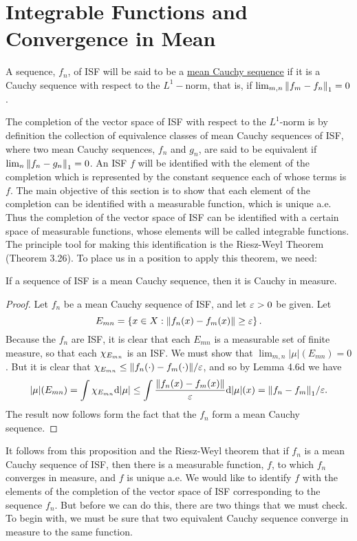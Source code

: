 \section{Integrable Functions and Convergence in Mean}

\begin{definition}
A sequence, $f_n$, of ISF will be said to be a \underline{mean Cauchy sequence} if it is a Cauchy sequence with respect to the $L^1-$norm, that is, if $\lim_{m, n}\norm{f_m-f_n}_1=0$.
\end{definition}

The completion of the vector space of ISF with respect to the $L^1$-norm is by definition the collection of equivalence classes of mean Cauchy sequences of ISF, where two mean Cauchy sequences, $f_n$ and $g_n$, are said to be equivalent if $\lim_n\norm{f_n-g_n}_1=0$. An ISF $f$ will be identified with the element of the completion which is represented by the constant sequence each of whose terms is $f$. The main objective of this section is to show that each element of the completion can be identified with a measurable function, which is unique a.e. Thus the completion of the vector space of ISF can be identified with a certain space of measurable functions, whose elements will be called integrable functions. The principle tool for making this identification is the Riesz-Weyl Theorem (Theorem 3.26). To place us in a position to apply this theorem, we need:

\begin{lemma}
If a sequence of ISF is a mean Cauchy sequence, then it is Cauchy in measure.
\end{lemma}

\begin{proof}
Let $f_n$ be a mean Cauchy sequence of ISF, and let $\varepsilon>0$ be given. Let $$E_{mn}=\left\{x\in X:\norm{f_n(x)-f_m(x)}\geq\varepsilon\right\}.$$ Because the $f_n$ are ISF, it is clear that each $E_{mn}$ is a measurable set of finite measure, so that each $\chi_{E_{mn}}$ is an ISF. We must show that $\lim_{m,n}|\mu|(E_{mn})=0$. But it is clear that $\chi_{E_{mn}}\leq\norm{f_n(\cdot)-f_m(\cdot)}/\varepsilon$, and so by Lemma 4.6d we have $$|\mu|(E_{mn})=\int\chi_{E_{mn}}\dd|\mu|\leq\int\frac{\norm{f_n(x)-f_m(x)}}{\varepsilon}\dd|\mu|(x)=\norm{f_n-f_m}_1/\varepsilon.$$ The result now follows form the fact that the $f_n$ form a mean Cauchy sequence.
\end{proof}

It follows from this proposition and the Riesz-Weyl theorem that if $f_n$ is a mean Cauchy sequence of ISF, then there is a measurable function, $f$, to which $f_n$ converges in measure, and $f$ is unique a.e. We would like to identify $f$ with the elements of the completion of the vector space of ISF corresponding to the sequence $f_n$. But before we can do this, there are two things that we must check. To begin with, we must be sure that two equivalent Cauchy sequence converge in measure to the same function.

